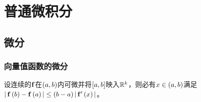 \documentclass{ctexrep}
\begin{document}
\fi


\chapter{普通微积分}
  \section{微分}
  \subsection{向量值函数的微分}
  \begin{theorem}
    \label{thm:vfab}
    设连续的$\mathbf{f}$在$\left(a,b\right)$内可微并将$\left[a,b\right]$映入$\mathbb{R}^k$，则必有$x\in\left(a,b\right)$满足$\left|\, \mathbf{f}\left(b\right)-\mathbf{f}\left(a\right) \,\right|\le\left(b-a\right)\left|\, \mathbf{f}'\left(x\right) \,\right|$。
  \end{theorem}


 
\ifx\allfiles\undefined %
\end{document}
